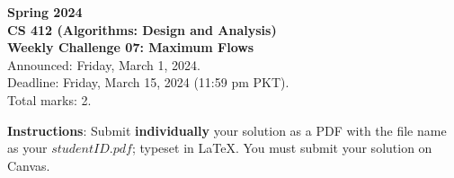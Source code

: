\documentclass[a4paper]{exam}
\begin{document}
\begin{center}
{\Large \textbf{Spring 2024}}\vspace{1.0em}\\
{\Large \textbf{CS 412 (Algorithms: Design and Analysis)}}\vspace{1.0em}\\
{\Large \textbf{Weekly Challenge 07: Maximum Flows}}\vspace{1.0em}\\
{\Large Announced: Friday, March 1, 2024.}\\
\vspace{.25em}
{\Large Deadline: Friday, March 15, 2024 (11:59 pm PKT).}\\ 
\vspace{.3em}
{\Large Total marks: 2.}
\vspace{.5em}\\
\end{center}
\textbf{Instructions}: Submit \textbf{individually} your solution as a PDF with the file name as your $studentID.pdf$; typeset in LaTeX. You must submit your solution on Canvas.
\end{document}
